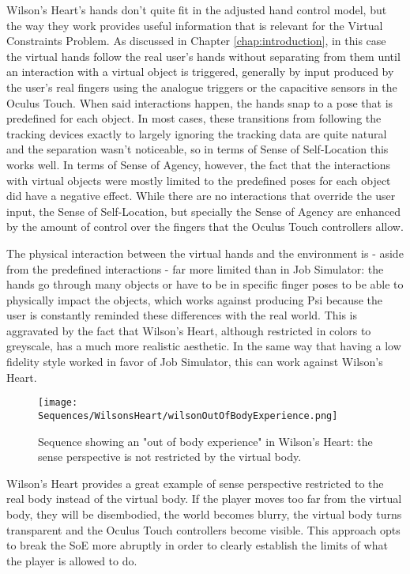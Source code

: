 Wilson's Heart's hands don't quite fit in the adjusted hand control model, but the way they work provides useful information that is relevant for the Virtual Constraints Problem. As discussed in Chapter \ref{chap:introduction}, in this case the virtual hands follow the real user's hands without separating from them until an interaction with a virtual object is triggered, generally by input produced by the user's real fingers using the analogue triggers or the capacitive sensors in the Oculus Touch. When said interactions happen, the hands snap to a pose that is predefined for each object. In most cases, these transitions from following the tracking devices exactly to largely ignoring the tracking data are quite natural and the separation wasn't noticeable, so in terms of Sense of Self-Location this works well. In terms of Sense of Agency, however, the fact that the interactions with virtual objects were mostly limited to the predefined poses for each object did have a negative effect. While there are no interactions that override the user input, the Sense of Self-Location, but specially the Sense of Agency are enhanced by the amount of control over the fingers that the Oculus Touch controllers allow.

The physical interaction between the virtual hands and the environment is - aside from the predefined interactions - far more limited than in Job Simulator: the hands go through many objects or have to be in specific finger poses to be able to physically impact the objects, which works against producing Psi because the user is constantly reminded these differences with the real world. This is aggravated by the fact that Wilson's Heart, although restricted in colors to greyscale, has a much more realistic aesthetic. In the same way that having a low fidelity style worked in favor of Job Simulator, this can work against Wilson's Heart.

\begin{figure}[h]
\centering
\texttt{[image: Sequences/WilsonsHeart/wilsonOutOfBodyExperience.png]}
\caption{Sequence showing an "out of body experience" in Wilson's Heart: the sense perspective is not restricted by the virtual body.}
\label{fig:wilsonOutOfBody}
\end{figure}

Wilson's Heart provides a great example of sense perspective restricted to the real body instead of the virtual body. If the player moves too far from the virtual body, they will be disembodied, the world becomes blurry, the virtual body turns transparent and the Oculus Touch controllers become visible. This approach opts to break the SoE more abruptly in order to clearly establish the limits of what the player is allowed to do.